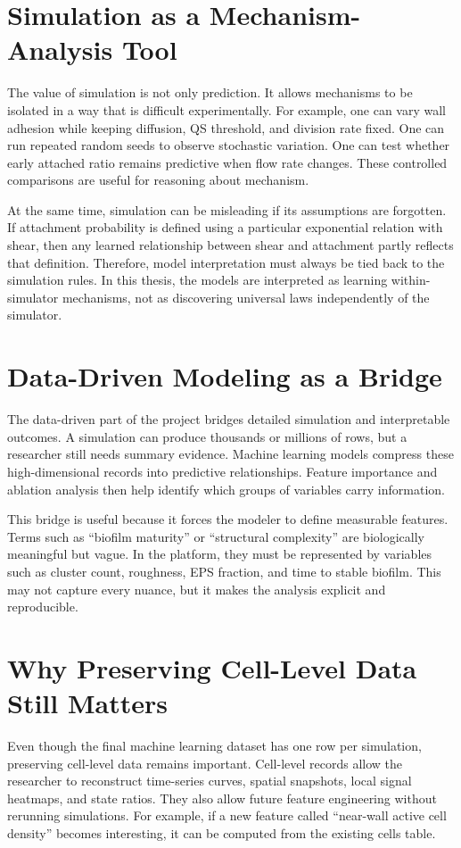 \documentclass[12pt,a4paper,oneside]{report}
\begin{document}
\section{Simulation as a Mechanism-Analysis Tool}
The value of simulation is not only prediction. It allows mechanisms to be isolated in a way that is difficult experimentally. For example, one can vary wall adhesion while keeping diffusion, QS threshold, and division rate fixed. One can run repeated random seeds to observe stochastic variation. One can test whether early attached ratio remains predictive when flow rate changes. These controlled comparisons are useful for reasoning about mechanism.

At the same time, simulation can be misleading if its assumptions are forgotten. If attachment probability is defined using a particular exponential relation with shear, then any learned relationship between shear and attachment partly reflects that definition. Therefore, model interpretation must always be tied back to the simulation rules. In this thesis, the models are interpreted as learning within-simulator mechanisms, not as discovering universal laws independently of the simulator.

\section{Data-Driven Modeling as a Bridge}
The data-driven part of the project bridges detailed simulation and interpretable outcomes. A simulation can produce thousands or millions of rows, but a researcher still needs summary evidence. Machine learning models compress these high-dimensional records into predictive relationships. Feature importance and ablation analysis then help identify which groups of variables carry information.

This bridge is useful because it forces the modeler to define measurable features. Terms such as ``biofilm maturity'' or ``structural complexity'' are biologically meaningful but vague. In the platform, they must be represented by variables such as cluster count, roughness, EPS fraction, and time to stable biofilm. This may not capture every nuance, but it makes the analysis explicit and reproducible.

\section{Why Preserving Cell-Level Data Still Matters}
Even though the final machine learning dataset has one row per simulation, preserving cell-level data remains important. Cell-level records allow the researcher to reconstruct time-series curves, spatial snapshots, local signal heatmaps, and state ratios. They also allow future feature engineering without rerunning simulations. For example, if a new feature called ``near-wall active cell density'' becomes interesting, it can be computed from the existing cells table.
\end{document}

